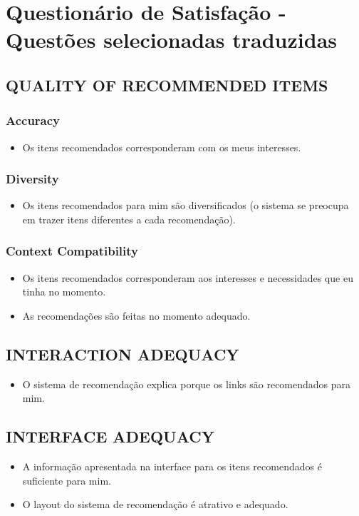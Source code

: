 \chapter{Questionário de Satisfação - Questões selecionadas traduzidas}\label{ape:questionario-de-satisfacao}

\section{QUALITY OF RECOMMENDED ITEMS}
\subsection{Accuracy}
\begin{itemize}
\item Os itens recomendados corresponderam com os meus interesses.
\end{itemize}
\subsection{Diversity}
\begin{itemize}
\item Os itens recomendados para mim são diversificados (o sistema se preocupa em trazer itens diferentes a cada recomendação).
\end{itemize}
\subsection{Context Compatibility}
\begin{itemize}
\item Os itens recomendados corresponderam aos  interesses e necessidades que eu tinha no momento.
\item As recomendações são feitas no momento adequado.
\end{itemize}
\section{INTERACTION ADEQUACY}
\begin{itemize}
\item O sistema de recomendação explica porque os links são recomendados para mim.
\end{itemize}
\section{INTERFACE ADEQUACY}
\begin{itemize}
\item A informação apresentada na interface para os itens recomendados é suficiente para mim.
\item O layout do sistema de recomendação é atrativo e adequado.
\end{itemize}
